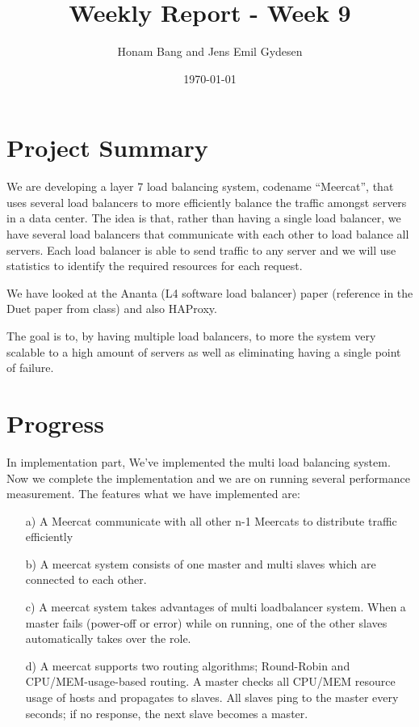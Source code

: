 \documentclass[11pt,letter]{article}
\author{Honam Bang and Jens Emil Gydesen}
\date{\today}
\title{Weekly Report - Week 9}
\begin{document}
\maketitle
\section{Project Summary}
We are developing a layer 7 load balancing system, codename ``Meercat'', that uses several load balancers to more efficiently balance the traffic amongst servers in a data center. The idea is that, rather than having a single load balancer, we have several load balancers that communicate with each other to load balance all servers. Each load balancer is able to send traffic to any server and we will use statistics to identify the required resources for each request.

We have looked at the Ananta (L4 software load balancer) paper (reference in the Duet paper from class)\cite{ananta} and also HAProxy\cite{haproxy}.

The goal is to, by having multiple load balancers, to more the system very scalable to a high amount of servers as well as eliminating having a single point of failure. 

\section{Progress}
In implementation part, We've implemented the multi load balancing system. Now we complete the implementation and we are on running several performance measurement. The features what we have implemented are:
\begin{enumerate}
	\item[a)] A Meercat communicate with all other n-1 Meercats to distribute traffic efficiently
	\item[b)]  A meercat system consists of one master and multi slaves which are connected to each other.
	\item[c)]  A meercat system takes advantages of multi loadbalancer system. When a master fails (power-off or error) while on running, one of the other slaves automatically takes over the role.
	\item[d)] A meercat supports two routing algorithms; Round-Robin and CPU/MEM-usage-based routing. A master checks all CPU/MEM resource usage of hosts and propagates to slaves. All slaves ping to the master every seconds; if no response, the next slave becomes a master.
\end{enumerate}
\end{document}
